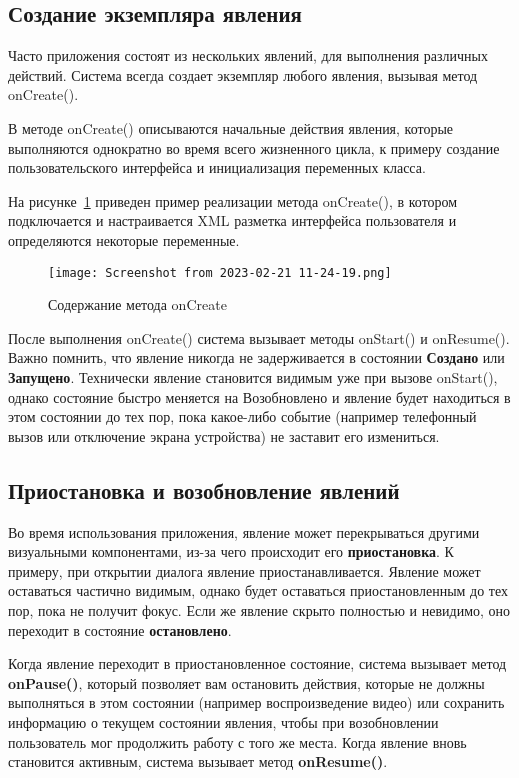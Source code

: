 \subsection{Создание экземпляра явления}
Часто приложения состоят из нескольких явлений, для выполнения
различных действий. Система всегда создает экземпляр любого явления,
вызывая метод onCreate().\par
В методе onCreate() описываются начальные действия явления, которые
выполняются однократно во время всего жизненного цикла, к примеру
создание пользовательского интерфейса и инициализация переменных
класса.\par
На рисунке~\ref{fig:activity:onCreate:content} приведен пример
реализации метода onCreate(), в котором подключается и настраивается XML
разметка интерфейса пользователя и определяются некоторые переменные.
\begin{figure}[h!tp]
	\centering
	\texttt{[image: Screenshot from 2023-02-21 11-24-19.png]}
	\caption{Содержание метода onCreate}
	\label{fig:activity:onCreate:content}
\end{figure}
После выполнения onCreate() система вызывает методы onStart() и
onResume(). Важно помнить, что явление никогда не задерживается в состоянии
\textbf{Создано} или \textbf{Запущено}. Технически явление становится
видимым уже при вызове onStart(), однако состояние быстро меняется на
Возобновлено и явление будет находиться в этом состоянии до тех пор,
пока какое-либо событие (например телефонный вызов или отключение экрана
устройства) не заставит его измениться.

\subsection{Приостановка и возобновление явлений}
Во время использования приложения, явление может перекрываться другими
визуальными компонентами, из-за чего происходит его \textbf{приостановка}. К
примеру, при открытии диалога явление приостанавливается. Явление может
оставаться частично видимым, однако будет оставаться приостановленным
до тех пор, пока не получит фокус. Если же явление скрыто полностью
и невидимо, оно переходит в состояние \textbf{остановлено}.\par
Когда явление переходит в приостановленное состояние, система вызывает
метод \textbf{onPause()}, который позволяет вам остановить действия, которые
не должны выполняться в этом состоянии (например воспроизведение видео)
или сохранить информацию о текущем состоянии явления, чтобы при
возобновлении пользователь мог продолжить работу с того же места. Когда
явление вновь становится активным, система вызывает метод \textbf{onResume()}.

